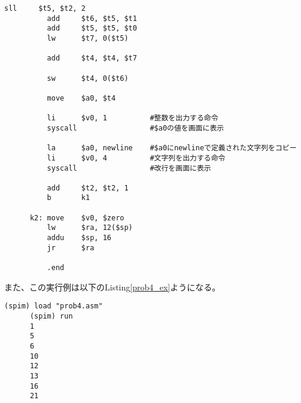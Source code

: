 \documentclass{jsarticle}
\begin{document}
\begin{description}
\begin{lstlisting}[caption=課題4のソースコード, label=prob4]
          sll     $t5, $t2, 2
          add     $t6, $t5, $t1
          add     $t5, $t5, $t0
          lw      $t7, 0($t5)

          add     $t4, $t4, $t7

          sw      $t4, 0($t6)

          move    $a0, $t4

          li      $v0, 1          #整数を出力する命令
          syscall                 #$a0の値を画面に表示

          la      $a0, newline    #$a0にnewlineで定義された文字列をコピー
          li      $v0, 4          #文字列を出力する命令
          syscall                 #改行を画面に表示

          add     $t2, $t2, 1
          b       k1

      k2: move    $v0, $zero
          lw      $ra, 12($sp)
          addu    $sp, 16
          jr      $ra

          .end
      \end{lstlisting}
      また、この実行例は以下のListing\ref{prob4_ex}ようになる。
      \begin{lstlisting}[caption=課題4の実行例, label=prob4_ex]
      (spim) load "prob4.asm"
      (spim) run
      1
      5
      6
      10
      12
      13
      16
      21
      \end{lstlisting}

  \end{description}
\end{document}
